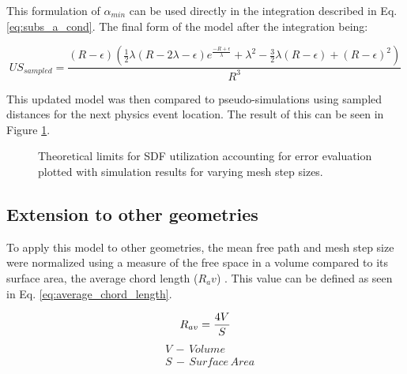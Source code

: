 This formulation of $\alpha_{min}$ can be used directly in the integration described
in Eq. \ref{eq:subs_a_cond}. The final form of the model after the integration being:

$$ US_{sampled} = \frac{(R-\epsilon) (\frac{1}{2} \lambda ( R - 2\lambda - \epsilon ) e^{\frac{-R + \epsilon}{\lambda}} +
\lambda^{2} - \frac{3}{2}\lambda(R - \epsilon) + (R-\epsilon)^{2})}{R^3}$$




This updated model was then compared to pseudo-simulations using sampled
distances for the next physics event location. The result of this can be seen in
Figure \ref{fig:sdf_util_sampled_distance_w_error}.

\begin{figure}[ht]
  \centering
  {\textwidth}
  \caption{Theoretical limits for SDF utilization accounting for error
    evaluation plotted with simulation results for varying mesh step sizes.}
  \label{fig:sdf_util_sampled_distance_w_error}
\end{figure}

\subsection{Extension to other geometries}

To apply this model to other geometries, the mean free path and mesh step size
were normalized using a measure of the free space in a volume compared to its
surface area, the average chord length ($R_av$) \cite{Wigner_1981}.  This value
can be defined as seen in Eq. \ref{eq:average_chord_length}.

\begin{equation}
\centering
 R_{av} = \frac{4V}{S}
 \label{eq:average_chord_length}
\end{equation}
\begin{align*}
 &V \, - \, Volume \\
 &S \, - \, Surface \, Area
\end{align*}


